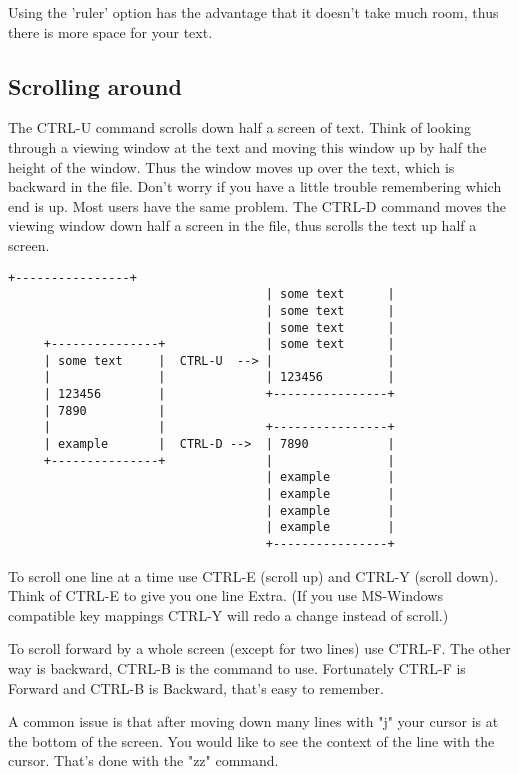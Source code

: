 Using the 'ruler' option has the advantage that it doesn't take much room,
thus there is more space for your text.

\subsection{Scrolling around}

The CTRL-U command scrolls down half a screen of text.
Think of looking through a viewing window at the text and moving this window up by half the height of the window.
Thus the window moves up over the text, which is backward in the file.
Don't worry if you have a little trouble remembering which end is up.
Most users have the same problem.
The CTRL-D command moves the viewing window down half a screen in the file, thus scrolls the text up half a screen.

\begin{Verbatim}[samepage=true]
                                    +----------------+
                                    | some text      |
                                    | some text      |
                                    | some text      |
     +---------------+              | some text      |
     | some text     |  CTRL-U  --> |                |
     |               |              | 123456         |
     | 123456        |              +----------------+
     | 7890          |
     |               |              +----------------+
     | example       |  CTRL-D -->  | 7890           |
     +---------------+              |                |
                                    | example        |
                                    | example        |
                                    | example        |
                                    | example        |
                                    +----------------+
\end{Verbatim}
 
To scroll one line at a time use CTRL-E (scroll up) and CTRL-Y (scroll down).
Think of CTRL-E to give you one line Extra.
(If you use MS-Windows compatible key mappings CTRL-Y will redo a change instead of scroll.)

To scroll forward by a whole screen (except for two lines) use CTRL-F.
The other way is backward, CTRL-B is the command to use.
Fortunately CTRL-F is Forward and CTRL-B is Backward, that's easy to remember.

A common issue is that after moving down many lines with "j" your cursor is at the bottom of the screen.
You would like to see the context of the line with the cursor.
That's done with the "zz" command.

